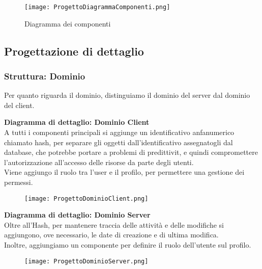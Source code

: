 \begin{figure}[h!]
    \begin{center}
        \texttt{[image: ProgettoDiagrammaComponenti.png]}
        \caption{Diagramma dei componenti}
    \end{center}
\end{figure}

\newpage

\subsection{Progettazione di dettaglio}

\subsubsection{Struttura: Dominio}

Per quanto riguarda il dominio, distinguiamo il dominio del server dal dominio del client.

\vspace{1em}

\textbf{Diagramma di dettaglio: Dominio Client}\\
A tutti i componenti principali si aggiunge un identificativo anfanumerico chiamato hash, 
per separare gli oggetti dall'identificativo assegnatogli dal database, che potrebbe portare a problemi di predittivit, e quindi compromettere l'autorizzazione all'accesso delle risorse da parte degli utenti.\\
Viene aggiungo il ruolo tra l'user e il profilo, per permettere una gestione dei permessi.
\begin{figure}[h!]
    \begin{center}
        \texttt{[image: ProgettoDominioClient.png]}
    \end{center}
\end{figure}
\clearpage
\textbf{Diagramma di dettaglio: Dominio Server}\\
Oltre all'Hash, per mantenere traccia delle attività e delle modifiche si aggiungono, ove necessario, 
le date di creazione e di ultima modifica.\\
Inoltre, aggiungiamo un componente per definire il ruolo dell'utente sul profilo.
\begin{figure}[h!]
    \begin{center}
        \texttt{[image: ProgettoDominioServer.png]}
    \end{center}
\end{figure}
\newpage



